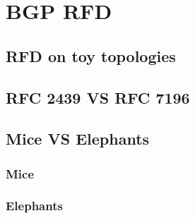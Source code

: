 \chapter{BGP RFD}
\label{cha:bgp_rfd}

\section{RFD on toy topologies}

\section{RFC 2439 VS RFC 7196}

\section{Mice VS Elephants}

\subsection{Mice}

\subsection{Elephants}


